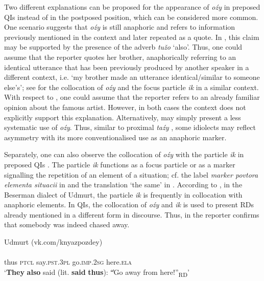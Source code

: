 \documentclass[output=paper,colorlinks,citecolor=brown]{langscibook}
\begin{document}
Two different explanations can be proposed for the appearance of {\textit{oźy}} in preposed QIs instead of in the postposed position, which can be considered more common. One scenario suggests that {\textit{oźy}} is still anaphoric and refers to information previously mentioned in the context and later repeated as a quote. In , this claim may be supported by the presence of the adverb \textit{tužo} ‘also’. Thus, one could assume that the reporter quotes her brother, anaphorically referring to an identical utterance that has been previously produced by another speaker in a different context, i.e. ‘my brother made an utterance identical/similar to someone else’s’; see  for the collocation of \textit{oźy} and the focus particle \textit{ik} in a similar context. With respect to , one could assume that the reporter refers to an already familiar opinion about the famous artist. However, in both cases the context does not explicitly support this explanation. Alternatively,  may simply present a less systematic use of \textit{oźy}. Thus, similar to proximal \textit{taźy} , some idiolects may reflect asymmetry with its more conventionalised use as an anaphoric marker.

Separately, one can also observe the collocation of \textit{oźy} with the particle \textit{ik} in preposed QIs . The particle \textit{ik} functions as a focus particle or as a marker signalling the repetition of an element of a situation; cf. the label \textit{marker povtora elementa situacii} in \citet[445]{Zubova2016} and the translation ‘the same’ in \citet{Arkhangelskiy2014}. According to \citet[445-446]{Zubova2016}, in the Beserman dialect of Udmurt, the particle \textit{ik} is frequently in collocation with anaphoric elements. In QIs, the collocation of \textit{oźy} and \textit{ik} is used to present RDs already mentioned in a different form in discourse. Thus, in  the reporter confirms that somebody was indeed chased away.

\ea\label{ex:teptiuk:16} {Udmurt (vk.com/knyazpozdey)}\\
\\
 {thus \textsc{ptcl} say.\textsc{pst.3pl} {\db}{\db}go.\textsc{imp.2sg} here.\textsc{ela}}\\
\glt ‘\textbf{They} \textbf{also} said (lit. \textbf{said} \textbf{thus}): \|“Go away from here!”\|\textsubscript{RD}’
\z
\end{document}
